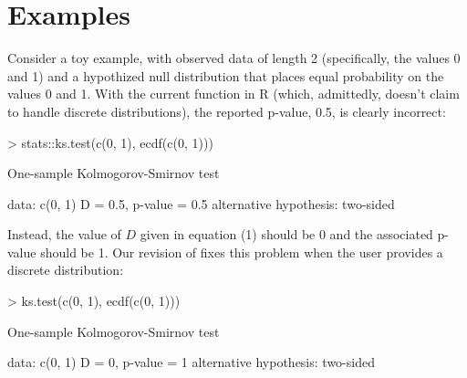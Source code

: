  
\section{Examples}

Consider a toy example, with observed data of length 2 (specifically, the
values 0 and 1) and a hypothized null distribution that places equal
probability on the values 0 and 1.  With the current  function
in R (which, admittedly, doesn't claim to handle discrete distributions),
the reported p-value, 0.5, is clearly incorrect:
\begin{Schunk}
\begin{Sinput}
> stats::ks.test(c(0, 1), ecdf(c(0, 1)))
\end{Sinput}
\begin{Soutput}
	One-sample Kolmogorov-Smirnov test

data:  c(0, 1) 
D = 0.5, p-value = 0.5
alternative hypothesis: two-sided 
\end{Soutput}
\end{Schunk}
Instead, the value of $D$ given in equation (1)
should be 0 and the associated p-value should be 1.  Our revision of 
fixes this problem when the user provides a discrete distribution:
\begin{Schunk} 
\begin{Sinput}
> ks.test(c(0, 1), ecdf(c(0, 1)))
\end{Sinput}
\begin{Soutput}
	One-sample Kolmogorov-Smirnov test

data:  c(0, 1) 
D = 0, p-value = 1
alternative hypothesis: two-sided 
\end{Soutput}
\end{Schunk}


